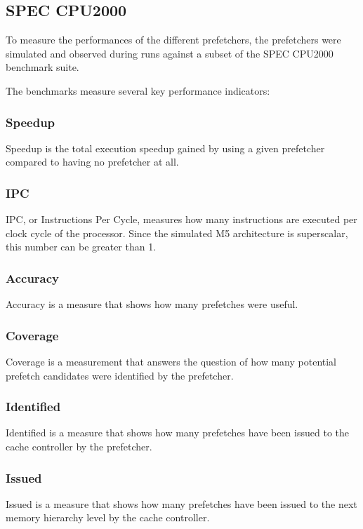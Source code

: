 \documentclass[a4paper]{IEEEtran}
\begin{document}
\subsection{SPEC CPU2000}

To measure the performances of the different prefetchers, the prefetchers were simulated and observed during runs against a subset of the SPEC CPU2000 benchmark suite.~\cite{http://dl.acm.org/citation.cfm?id=621510}

The benchmarks measure several key performance indicators:

\subsubsection{Speedup}
Speedup is the total execution speedup gained by using a given prefetcher compared to having no prefetcher at all.

\subsubsection{IPC}
IPC, or Instructions Per Cycle, measures how many instructions are executed per clock cycle of the processor.
Since the simulated M5 architecture is superscalar, this number can be greater than 1.

\subsubsection{Accuracy}
Accuracy is a measure that shows how many prefetches were useful.

\subsubsection{Coverage}
Coverage is a measurement that answers the question of how many potential prefetch candidates were identified by the prefetcher.

\subsubsection{Identified}
Identified is a measure that shows how many prefetches have been issued to the cache controller by the prefetcher.

\subsubsection{Issued}
Issued is a measure that shows how many prefetches have been issued to the next memory hierarchy level by the cache controller.
\end{document}
